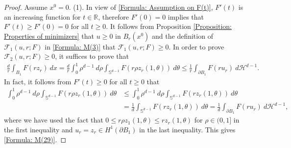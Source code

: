\documentclass[11pt,reqno]{amsart}
\begin{document}
\begin{proof}
	Assume $x^{0}=0$. (1). In view of \eqref{Formula: Assumption on F(t)}, $F'(t)$ is an increasing function for $t\in\mathbb{R}$, therefore $F'(0)=0$ implies that $F'(t)\geqslant F'(0)=0$ for all $t\geqslant0$. It follows from Proposition \ref{Proposition: Properties of minimizers} that $u\geqslant0$ in $B_{r}(x^{0})$ and the definition of $\mathcal{F}_{1}(u,r;F)$ in \eqref{Formula: M(3)} that $\mathcal{F}_{1}(u,r;F)\geqslant0$. In order to prove $\mathcal{F}_{2}(u,r;F)\geqslant0$, it suffices to prove that
	\begin{align}\label{Formula: M(29)}
		\frac{d}{r}\int_{B_{1}}F(rz_{r})\:dx=\frac{d}{r}\int_{0}^{1}\rho^{d-1}\:d\rho\int_{\mathbb{S}^{d-1}}F(r\rho z_{r}(1,\theta))\:d\theta\leqslant\frac{1}{r}\int_{\partial B_{1}}F(ru_{r})\:d\mathcal{H}^{d-1}.
	\end{align}
    In fact, it follows from $F'(t)\geqslant0$ for all $t\geqslant0$ that
    \begin{align*}
    	\int_{0}^{1}\rho^{d-1}\:d\rho\int_{\mathbb{S}^{d-1}}F(r\rho z_{r}(1,\theta))\:d\theta&\leqslant\int_{0}^{1}\rho^{d-1}\:d\rho\int_{\mathbb{S}^{d-1}}F(rz_{r}(1,\theta))\:d\theta\\
    	&=\frac{1}{d}\int_{\mathbb{S}^{d-1}}F(rz_{r}(1,\theta))\:d\theta=\frac{1}{d}\int_{\partial B_{1}}F(ru_{r})\:d\mathcal{H}^{d-1},
    \end{align*}
    where we have used the fact that $0\leqslant r\rho z_{1}(1,\theta)\leqslant rz_{r}(1,\theta)$ for $\rho\in(0,1]$ in the first inequality and $u_{r}=z_{r}\in H^{1}(\partial B_{1})$ in the last inequality. This gives \eqref{Formula: M(29)}.
    

\end{proof}
\end{document}
